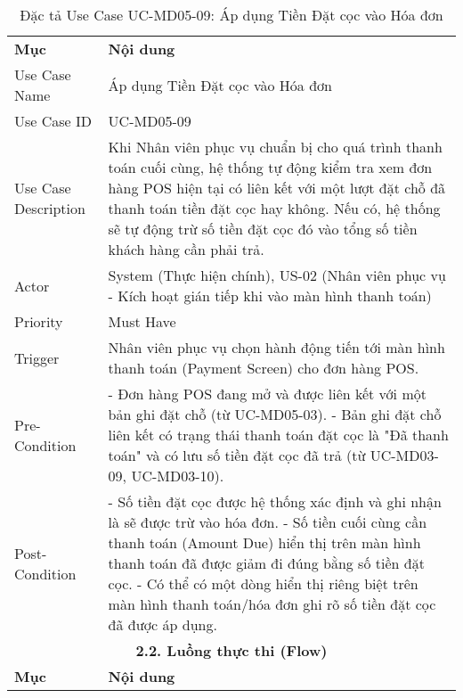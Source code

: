 \begin{longtable}{|m{4cm}|p{11cm}|}
\caption{Đặc tả Use Case UC-MD05-09: Áp dụng Tiền Đặt cọc vào Hóa đơn} \label{tab:uc_md05_09} \\
\hline

\endhead %
\hline
\endfoot %
\hline
\endlastfoot %
\multicolumn{2}{|c|}{\textbf{2.1. Tóm tắt (Summary)}} \\
\hline
\textbf{Mục} & \textbf{Nội dung} \\
\hline
Use Case Name & Áp dụng Tiền Đặt cọc vào Hóa đơn \\
\hline
Use Case ID & UC-MD05-09 \\
\hline
Use Case Description & Khi Nhân viên phục vụ chuẩn bị cho quá trình thanh toán cuối cùng, hệ thống tự động kiểm tra xem đơn hàng POS hiện tại có liên kết với một lượt đặt chỗ đã thanh toán tiền đặt cọc hay không. Nếu có, hệ thống sẽ tự động trừ số tiền đặt cọc đó vào tổng số tiền khách hàng cần phải trả. \\
\hline
Actor & System (Thực hiện chính), US-02 (Nhân viên phục vụ - Kích hoạt gián tiếp khi vào màn hình thanh toán) \\
\hline
Priority & Must Have \\
\hline
Trigger & Nhân viên phục vụ chọn hành động tiến tới màn hình thanh toán (Payment Screen) cho đơn hàng POS. \\
\hline
Pre-Condition & - Đơn hàng POS đang mở và được liên kết với một bản ghi đặt chỗ (từ UC-MD05-03). \newline - Bản ghi đặt chỗ liên kết có trạng thái thanh toán đặt cọc là "Đã thanh toán" và có lưu số tiền đặt cọc đã trả (từ UC-MD03-09, UC-MD03-10). \\
\hline
Post-Condition & - Số tiền đặt cọc được hệ thống xác định và ghi nhận là sẽ được trừ vào hóa đơn. \newline - Số tiền cuối cùng cần thanh toán (Amount Due) hiển thị trên màn hình thanh toán đã được giảm đi đúng bằng số tiền đặt cọc. \newline - Có thể có một dòng hiển thị riêng biệt trên màn hình thanh toán/hóa đơn ghi rõ số tiền đặt cọc đã được áp dụng. \\
\hline
\multicolumn{2}{|c|}{\textbf{2.2. Luồng thực thi (Flow)}} \\
\hline
\textbf{Mục} & \textbf{Nội dung} \\
\hline

\end{longtable}
